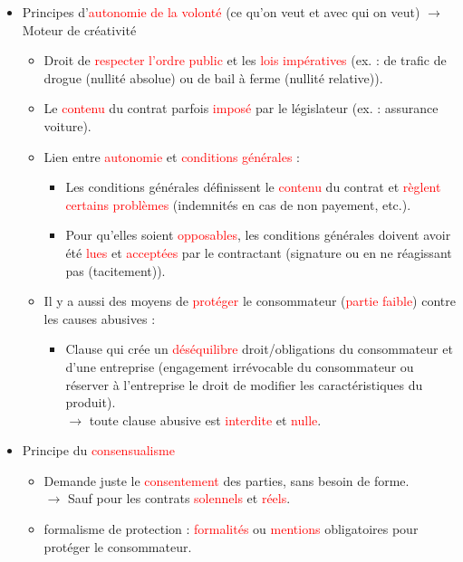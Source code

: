 \begin{itemize}
	\item Principes d'\textcolor{red}{autonomie de la volonté} (ce qu'on veut et avec qui on veut) $\rightarrow$ Moteur de créativité
	\begin{itemize}
		\item Droit de \textcolor{red}{respecter l'ordre public} et les \textcolor{red}{lois impératives} (ex. : de trafic de drogue (nullité absolue) ou de bail à ferme (nullité relative)).
		\item Le \textcolor{red}{contenu} du contrat parfois \textcolor{red}{imposé} par le législateur (ex. : assurance voiture).
		\item Lien entre \textcolor{red}{autonomie} et \textcolor{red}{conditions générales} :
		\begin{itemize}
			\item Les conditions générales définissent le \textcolor{red}{contenu} du contrat et \textcolor{red}{règlent certains problèmes} (indemnités en cas de non payement, etc.).
			\item Pour qu'elles soient \textcolor{red}{opposables}, les conditions générales doivent avoir été \textcolor{red}{lues} et \textcolor{red}{acceptées} par le contractant (signature ou en ne réagissant pas (tacitement)).
		\end{itemize}
		\item Il y a aussi des moyens de \textcolor{red}{protéger} le consommateur (\textcolor{red}{partie faible}) contre les causes abusives :
		\begin{itemize}
			\item Clause qui crée un \textcolor{red}{déséquilibre} droit/obligations du consommateur et d'une entreprise (engagement irrévocable du consommateur ou réserver à l'entreprise le droit de modifier les caractéristiques du produit).\\
			$\rightarrow$ toute clause abusive est \textcolor{red}{interdite} et \textcolor{red}{nulle}.
		\end{itemize}
	\end{itemize}
	\item Principe du \textcolor{red}{consensualisme}
	\begin{itemize}
		\item Demande juste le \textcolor{red}{consentement} des parties, sans besoin de forme.\\
		$\rightarrow$ Sauf pour les contrats \textcolor{red}{solennels} et \textcolor{red}{réels}.
		\item formalisme de protection : \textcolor{red}{formalités} ou \textcolor{red}{mentions} obligatoires pour protéger le consommateur.

\end{itemize}
\end{itemize}
